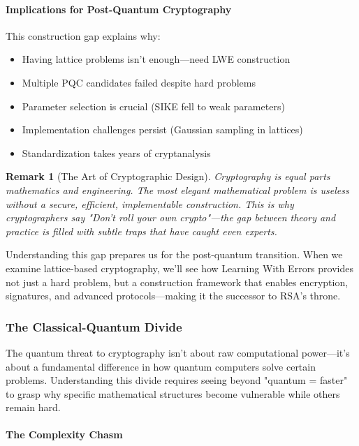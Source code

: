 \documentclass[11pt,a4paper]{article}
\newtheorem{remark}{Remark}
\begin{document}
\paragraph{Implications for Post-Quantum Cryptography}

This construction gap explains why:
\begin{itemize}
    \item Having lattice problems isn't enough---need LWE construction
    \item Multiple PQC candidates failed despite hard problems
    \item Parameter selection is crucial (SIKE fell to weak parameters)
    \item Implementation challenges persist (Gaussian sampling in lattices)
    \item Standardization takes years of cryptanalysis
\end{itemize}

\begin{remark}[The Art of Cryptographic Design]
Cryptography is equal parts mathematics and engineering. The most elegant mathematical problem is useless without a secure, efficient, implementable construction. This is why cryptographers say "Don't roll your own crypto"---the gap between theory and practice is filled with subtle traps that have caught even experts.
\end{remark}

Understanding this gap prepares us for the post-quantum transition. When we examine lattice-based cryptography, we'll see how Learning With Errors provides not just a hard problem, but a construction framework that enables encryption, signatures, and advanced protocols---making it the successor to RSA's throne.

\subsubsection{The Classical-Quantum Divide}

The quantum threat to cryptography isn't about raw computational power---it's about a fundamental difference in how quantum computers solve certain problems. Understanding this divide requires seeing beyond "quantum = faster" to grasp why specific mathematical structures become vulnerable while others remain hard.

\paragraph{The Complexity Chasm}
\end{document}
